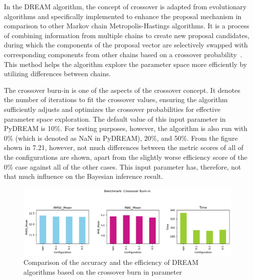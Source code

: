 In the DREAM algorithm, the concept of crossover is adapted from evolutionary algorithms and specifically implemented to enhance the proposal mechanism in comparison to other Markov chain Metropolis-Hastings algorithms. It is a process of combining information from multiple chains to create new proposal candidates, during which the components of the proposal vector are selectively swapped with corresponding components from other chains based on a crossover probability~\cite{dream}. This method helps the algorithm explore the parameter space more efficiently by utilizing differences between chains.

The crossover burn-in is one of the aspects of the crossover concept. It denotes the number of iterations to fit the crossover values, ensuring the algorithm sufficiently adjusts and optimizes the crossover probabilities for effective parameter space exploration. The default value of this input parameter in PyDREAM is 10\%. For testing purposes, however, the algorithm is also run with 0\% (which is denoted as NaN in PyDREAM), 20\%, and 50\%. From the figure shown in 7.21, however, not much differences between the metric scores of all of the configurations are shown, apart from the slightly worse efficiency score of the 0\% case against all of the other cases. This input parameter has, therefore, not that much influence on the Bayesian inference result.
\begin{figure}[H]
    \centering
    \includegraphics[width=1\textwidth]{figures/dream/crossover_burn_in.png}
    \captionsetup{width=.8\textwidth}
    \caption{Comparison of the accuracy and the efficiency of DREAM algorithms based on the crossover burn in parameter}
    \label{fig:enter-label}
\end{figure}

